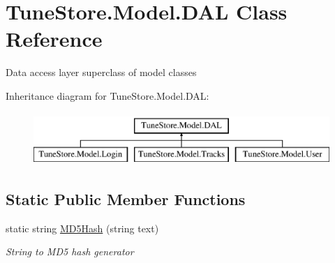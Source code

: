 \hypertarget{class_tune_store_1_1_model_1_1_d_a_l}{\section{Tune\+Store.\+Model.\+D\+A\+L Class Reference}
\label{class_tune_store_1_1_model_1_1_d_a_l}
}


Data access layer superclass of model classes  


Inheritance diagram for Tune\+Store.\+Model.\+D\+A\+L\+:\begin{figure}[H]
\begin{center}
\leavevmode
\includegraphics[height=2.000000cm]{class_tune_store_1_1_model_1_1_d_a_l}
\end{center}
\end{figure}
\subsection*{Static Public Member Functions}
\begin{DoxyCompactItemize}
\item 
static string \hyperlink{class_tune_store_1_1_model_1_1_d_a_l_abc0363548c4a5260b488da0180643388}{M\+D5\+Hash} (string text)
\begin{DoxyCompactList}\small\item\em String to M\+D5 hash generator \end{DoxyCompactList}\end{DoxyCompactItemize}

